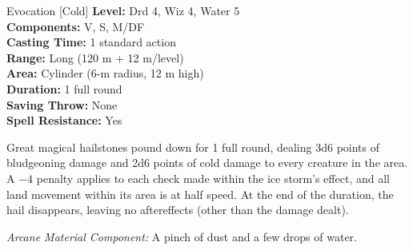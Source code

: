 {Evocation [Cold]}
{
	\textbf{Level:}
	Drd 4, Wiz 4, Water 5\\
	\textbf{Components:}
	V, S, M/DF\\
	\textbf{Casting Time:}
	1 standard action\\
	\textbf{Range:}
	Long (120 m + 12 m/level)\\
	\textbf{Area:}
	Cylinder (6-m radius, 12 m high)\\
	\textbf{Duration:}
	1 full round\\
	\textbf{Saving Throw:}
	None\\
	\textbf{Spell Resistance:}
	Yes\\
}
{
	Great magical hailstones pound down for 1 full round, dealing 3d6 points of bludgeoning damage and 2d6 points of cold damage to every creature in the area. A $-4$ penalty applies to each  check made within the ice storm's effect, and all land movement within its area is at half speed. At the end of the duration, the hail disappears, leaving no aftereffects (other than the damage dealt).

	\textit{Arcane Material Component:}
	A pinch of dust and a few drops of water.

}
